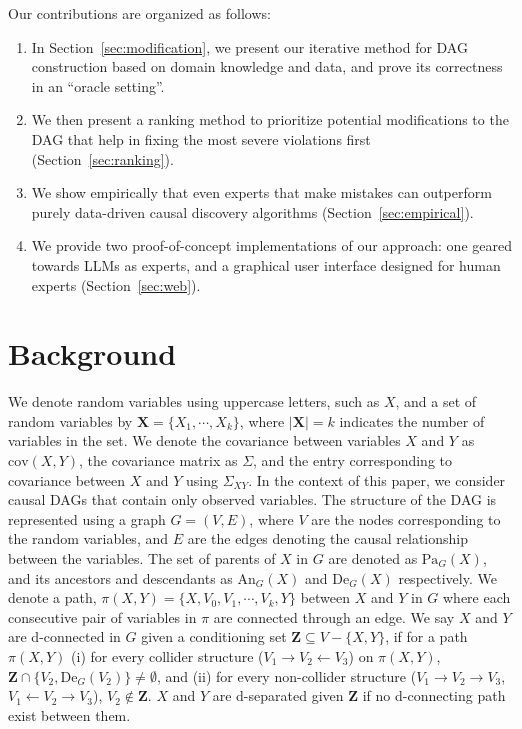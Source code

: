 \documentclass{uai2025} %
\begin{document}
Our contributions are organized as follows:

\begin{enumerate}
    \item In Section~\ref{sec:modification}, we present our iterative method for DAG construction
	based on domain knowledge and data, and prove its correctness in an ``oracle setting''.
    \item We then present a ranking method to prioritize potential modifications to the DAG that 
    	    help in fixing the most severe violations first (Section~\ref{sec:ranking}).
    \item We show empirically that even experts that make mistakes can outperform purely 
	data-driven
	causal discovery algorithms (Section~\ref{sec:empirical}).
    \item We provide two proof-of-concept implementations of our approach: one geared towards
	LLMs as experts, and a graphical user interface designed 
	for human experts (Section~\ref{sec:web}).
\end{enumerate}

\section{Background}
\label{sec:background}
We denote random variables using uppercase letters, such as $ X $, and a set of
random variables by $ \bm{X} = \{X_1, \cdots, X_k\} $, where $ \rvert \bm{X}
\rvert = k $ indicates the number of variables in the set. We denote the
covariance between variables $ X $ and $ Y $ as $ \mathrm{cov}(X, Y) $, the
covariance matrix as $ \Sigma $, and the entry corresponding to covariance
between $ X $ and $ Y $ using $ \Sigma_{XY} $. In the context of this paper, we
consider causal DAGs that contain only observed variables. The structure of the
DAG is represented using a graph $ G = (V, E) $, where $ V $ are the nodes
corresponding to the random variables, and $ E $ are the edges denoting the
causal relationship between the variables. The set of parents of $ X $ in $ G $
are denoted as $ \textrm{Pa}_G(X) $, and its ancestors and descendants as $
\textrm{An}_G(X) $ and $ \textrm{De}_G(X) $ respectively. We denote a path, $
\pi(X, Y) = \{ X, V_0, V_1, \cdots, V_k, Y \} $ between $ X $ and $ Y $ in $ G
$ where each consecutive pair of variables in $ \pi $ are connected through an
edge. We say $ X $ and $ Y $ are d-connected in $ G $ given a conditioning set
$ \bm{Z} \subseteq V - \{X, Y\} $, if for a path $ \pi(X, Y) $ (i) for every
collider structure ($ V_1 \rightarrow V_2 \leftarrow V_3 $) on $ \pi(X, Y) $, $
\bm{Z} \cap \{ V_2, \textrm{De}_G(V_2) \} \ne \emptyset $, and (ii) for every
non-collider structure ($ V_1 \rightarrow V_2 \rightarrow V_3 $, $ V_1
\leftarrow V_2 \rightarrow V_3 $), $ V_2 \not \in \bm{Z} $. $ X $ and $ Y $ are
d-separated given $ \bm{Z} $ if no d-connecting path exist between them.
\end{document}
